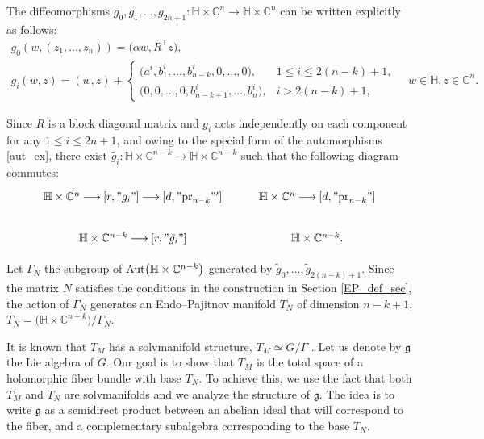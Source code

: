 \documentclass[pdftex]{sigma}
\newcommand{\6}{\partial}
\newcommand{\arrow}{{\:\longrightarrow\:}}
\numberwithin{equation}{section}
\begin{document}
The diffeomorphisms $g_0, g_1, \dots, g_{2n+1}\colon \mathbb{H} \times \mathbb{C}^n \longrightarrow \mathbb{H} \times \mathbb{C}^n$ can be written explicitly as follows:
\begin{gather}
		g_0(w, (z_1, \dots, z_n)) = \bigl(\alpha w, R^{\mathsf{T}}z\bigr),\label{aut_ex}\\
		g_i(w, z) = (w, z) +
\begin{cases}
\big(a^i, b_1^i, \dots, b_{n-k}^i, 0, \dots, 0\big), & 1 \leq i \leq 2(n-k)+1, \\
\big(0, 0, \dots, 0, b_{n-k+1}^i, \dots, b_n^i\big), & i > 2(n-k)+1,
\end{cases}
\quad w \in \mathbb{H}, z \in \mathbb{C}^n.\nonumber
\end{gather}

Since $R$ is a block diagonal matrix and $g_i$ acts independently on each component for any $ 1 \leq i \leq 2n+1$, and owing to the special form of the automorphisms \eqref{aut_ex}, there exist ${\tilde{g_i}\colon \mathbb{H} \times \mathbb{C}^{n-k} \longrightarrow \mathbb{H} \times \mathbb{C}^{n-k}}$ such that the following diagram commutes:
\[
\begin{tikzcd}
	\mathbb{H} \times \mathbb{C}^{n} \arrow[r, "g_i"] \arrow[d, "{\rm pr}_{n-k}"'] & \mathbb{H} \times \mathbb{C}^{n} \arrow[d, "{\rm pr}_{n-k}"] \\
	\mathbb{H} \times \mathbb{C}^{n-k} \arrow[r, "\tilde{g_i}"] & \mathbb{H} \times \mathbb{C}^{n-k}.
\end{tikzcd}
\]

Let $\Gamma_N$ the subgroup of ${\rm Aut}\bigl(\mathbb{H} \times \mathbb{C}^{n-k}\bigr)$ generated by $\tilde g_0, \dots, \tilde g_{2(n-k)+1}$.
Since the matrix $N$ satisfies the conditions in the construction in Section \ref{EP_def_sec}, the action of $\Gamma_N$ generates an Endo--Pajitnov manifold $T_N$ of dimension $n-k+1$, $T_N=\big(\mathbb{H} \times \mathbb{C}^{n-k}\big)/ {\Gamma_N}$.

It is known that $T_M$ has a solvmanifold structure, $T_M \simeq G/{\Gamma}$ \cite[Theorem~3.1]{cos}. Let us denote by $\mathfrak{g}$ the Lie algebra of $G$.
Our goal is to show that $T_M$ is the total space of a holomorphic fiber bundle with base $T_N$. To achieve this, we use the fact that both $T_M$ and $T_N$ are solvmanifolds and we analyze the structure of $\mathfrak{g}$. The idea is to write $\mathfrak{g}$ as a semidirect product between an abelian ideal that will correspond to the fiber, and a complementary subalgebra corresponding to the base $T_N$.
\end{document}

